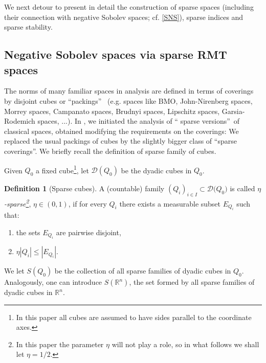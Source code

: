 \documentclass[11pt, a4paper,leqno]{amsart}
\theoremstyle{plain}
\numberwithin{equation}{section}
\theoremstyle{definition}
\newtheorem{definition}{Definition}
\theoremstyle{remark}
\def\R{\mathbb{R}}
\begin{document}
We next detour to present in detail the construction of
sparse spaces (including their connection with negative Sobolev spaces; cf. \eqref{SNS}), sparse indices and sparse stability. 













\subsection{Negative Sobolev spaces via sparse RMT spaces\label{sec:functionsbackground}}

The norms of many familiar spaces in analysis are defined in terms of
coverings by disjoint cubes or \textquotedblleft packings\textquotedblright%
\ (e.g. spaces like BMO, John-Nirenberg spaces, Morrey spaces,
Campanato spaces, Brudnyi spaces, Lipschitz spaces, Garsia-Rodemich spaces, ...). In \cite{DMComptes}, we initiated the analysis of \textquotedblleft
sparse versions\textquotedblright\ of classical spaces,  obtained
modifying the requirements on the coverings: We replaced the usual packings of
cubes by the slightly bigger class of \textquotedblleft sparse
coverings\textquotedblright. We briefly recall the definition of sparse family of cubes.

Given 
$Q_{0}$ a fixed cube\footnote{In this paper all cubes are assumed to have sides
parallel to the coordinate axes.}, let $\mathcal{D}(Q_{0})$ be the
dyadic cubes in $Q_{0}$.



\begin{definition}[Sparse cubes]
\label{DefnSparse} A  (countable) family $(Q_{i})_{i\in
I} \subset \mathcal{D(}Q_{0})$ is called \emph{$\eta
$-sparse\footnote{In this paper the parameter $\eta$ will not play a role,
so in what follows we shall let $\eta=1/2$.}}, $\eta\in(0,1)$, if for every
$Q_{i}$ there exists a measurable subset $E_{Q_{i}}$ such that:
\begin{enumerate}
\item[(i)] the sets $E_{Q_{i}}$ are pairwise disjoint,
\item[(ii)] $\eta |Q_{i}|\leq|E_{Q_{i}}|$.
\end{enumerate}
We let $S(Q_{0})$ be the collection of all sparse families of
dyadic cubes in $Q_{0}.$ Analogously, one can introduce $S(\R^n)$, the set formed by all sparse  families of dyadic cubes in $\R^n$. 
\end{definition}
\end{document}
